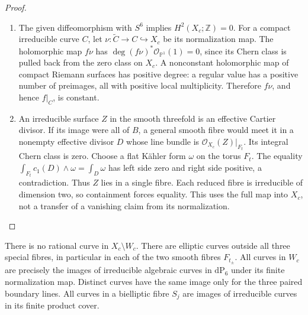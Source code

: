 \begin{proof}
\begin{enumerate}[label=\arabic*.,leftmargin=*]
\item The given diffeomorphism with \(S^6\) implies \(H^2(X_c;\mathbb Z)=0\).
For a compact irreducible curve \(C\), let
\(\nu:\widetilde C\to C\hookrightarrow X_c\) be its normalization map.
The holomorphic map \(f\nu\) has
\(\deg (f\nu)^*\mathcal O_{\mathbb P^1}(1)=0\), since its Chern class is
pulled back from the zero class on \(X_c\). A nonconstant holomorphic map
of compact Riemann surfaces has positive degree: a regular value has a
positive number of preimages, all with positive local multiplicity.
Therefore \(f\nu\), and hence \(f|_C\), is constant.

\item An irreducible surface \(Z\) in the smooth threefold is an effective
Cartier divisor. If its image were all of \(B\), a general smooth fibre
would meet it in a nonempty effective divisor \(D\) whose line bundle
is \(\mathcal O_{X_c}(Z)|_{F_t}\). Its integral Chern class is zero.
Choose a flat K\"ahler form \(\omega\) on the torus \(F_t\). The equality
\(\int_{F_t}c_1(D)\wedge\omega=\int_D\omega\) has left side zero and right
side positive, a contradiction. Thus \(Z\) lies in a single fibre.
Each reduced fibre is irreducible of dimension two, so containment forces
equality. This uses the full map into \(X_c\), not a transfer of a
vanishing claim from its normalization.
\end{enumerate}
\end{proof}

\begin{proposition}\hypertarget{tag-01QZ}{}\label{fam:src:D.2.2}\label{fam:st:D.2.2}

There is no rational curve in \(X_c\setminus W_c\). There are elliptic
curves outside all three special fibres, in particular in each of the
two smooth fibres \(F_{t_\pm}\). All curves in \(W_c\) are precisely the
images of irreducible algebraic curves in \(\mathrm{dP}_6\) under its
finite normalization map. Distinct curves have the same image only for
the three paired boundary lines. All curves in a bielliptic fibre
\(S_j\) are images of irreducible curves in its finite product cover.
\end{proposition}


